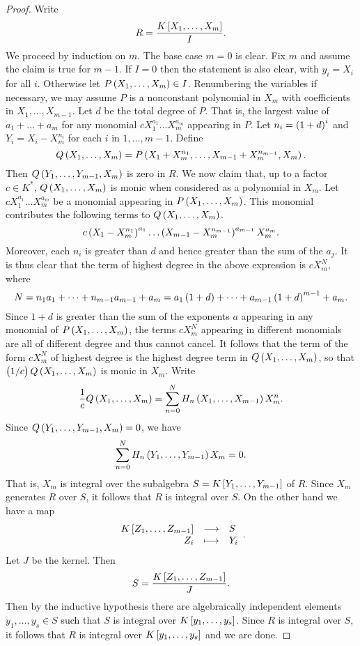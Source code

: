 \begin{proof}
Write
$$ R = \dfrac{K\sbr{X_1, \dots, X_m}}{I}. $$
We proceed by induction on $ m $. The base case $ m = 0 $ is clear. Fix $ m $ and assume the claim is true for $ m - 1 $. If $ I = 0 $ then the statement is also clear, with $ y_i = X_i $ for all $ i $. Otherwise let $ P\br{X_1, \dots, X_m} \in I $. Renumbering the variables if necessary, we may assume $ P $ is a nonconstant polynomial in $ X_m $ with coefficients in $ X_1, \dots, X_{m - 1} $. Let $ d $ be the total degree of $ P $. That is, the largest value of $ a_1 + \dots + a_m $ for any monomial $ cX_1^{a_1} \dots X_m^{a_m} $ appearing in $ P $. Let $ n_i = \br{1 + d}^i $ and $ Y_i = X_i - X_m^{n_i} $ for each $ i $ in $ 1, \dots, m - 1 $. Define
$$ Q\br{X_1, \dots, X_m} = P\br{X_1 + X_m^{n_1}, \dots, X_{m - 1} + X_m^{n_{m - 1}}, X_m}. $$
Then $ Q\br{Y_1, \dots, Y_{m - 1}, X_m} $ is zero in $ R $. We now claim that, up to a factor $ c \in K^* $, $ Q\br{X_1, \dots, X_m} $ is monic when considered as a polynomial in $ X_m $. Let $ cX_1^{a_1} \dots X_m^{a_m} $ be a monomial appearing in $ P\br{X_1, \dots, X_m} $. This monomial contributes the following terms to $ Q\br{X_1, \dots, X_m} $.
$$ c\br{X_1 - X_m^{n_1}}^{a_1} \dots \br{X_{m - 1} - X_m^{n_{m - 1}}}^{a_{m - 1}}X_m^{a_m}. $$
Moreover, each $ n_i $ is greater than $ d $ and hence greater than the sum of the $ a_j $. It is thus clear that the term of highest degree in the above expression is $ cX_m^N $, where
$$ N = n_1a_1 + \dots + n_{m - 1}a_{m - 1} + a_m = a_1\br{1 + d} + \dots + a_{m - 1}\br{1 + d}^{m - 1} + a_m. $$
Since $ 1 + d $ is greater than the sum of the exponents $ a $ appearing in any monomial of $ P\br{X_1, \dots, X_m} $, the terms $ cX_m^N $ appearing in different monomials are all of different degree and thus cannot cancel. It follows that the term of the form $ cX_m^N $ of highest degree is the highest degree term in $ Q\br{X_1, \dots, X_m} $, so that $ \br{1 / c}Q\br{X_1, \dots, X_m} $ is monic in $ X_m $. Write
$$ \dfrac{1}{c}Q\br{X_1, \dots, X_m} = \sum_{n = 0}^N H_n\br{X_1, \dots, X_{m - 1}}X_m^n. $$
Since $ Q\br{Y_1, \dots, Y_{m - 1}, X_m} = 0 $, we have
$$ \sum_{n = 0}^N H_n\br{Y_1, \dots, Y_{m - 1}}X_m = 0. $$
That is, $ X_m $ is integral over the subalgebra $ S = K\sbr{Y_1, \dots, Y_{m - 1}} $ of $ R $. Since $ X_m $ generates $ R $ over $ S $, it follows that $ R $ is integral over $ S $. On the other hand we have a map
$$ \function{K\sbr{Z_1, \dots, Z_{m - 1}}}{S}{Z_i}{Y_i}. $$
Let $ J $ be the kernel. Then
$$ S = \dfrac{K\sbr{Z_1, \dots, Z_{m - 1}}}{J}. $$
Then by the inductive hypothesis there are algebraically independent elements $ y_1, \dots, y_s \in S $ such that $ S $ is integral over $ K\sbr{y_1, \dots, y_s} $. Since $ R $ is integral over $ S $, it follows that $ R $ is integral over $ K\sbr{y_1, \dots, y_s} $ and we are done.
\end{proof}

